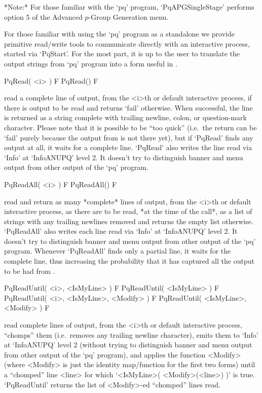 *Note:*
For those familiar with  the  `pq'  program,  `PqAPGSingleStage'  performs
option 5 of the Advanced $p$-Group Generation menu.


For those familiar with using the `pq' program as a standalone we  provide
primitive read/write tools to communicate directly  with  an  interactive
{\ANUPQ} process, started via `PqStart'. For the most part, it is  up  to
the user to translate the output strings from `pq'  program  into  a  form
useful in {\GAP}.

\>PqRead( <i> ) F
\>PqRead() F

read a complete line of  {\ANUPQ}  output,  from  the  <i>th  or  default
interactive {\ANUPQ} process, if there is output to be read  and  returns
`fail' otherwise. When successful, the  line  is  returned  as  a  string
complete with trailing newline, colon, or question-mark character. Please
note that it is possible to be ``too  quick''  (i.e.~the  return  can  be
`fail' purely because the output from {\ANUPQ} is not there yet), but  if
`PqRead' finds any output at all, it waits for a complete line.  `PqRead'
also writes the line read via `Info' at `InfoANUPQ' level 2.  It  doesn't
try to distinguish banner and menu output from other output of  the  `pq'
program.

\>PqReadAll( <i> ) F
\>PqReadAll() F

read and return as many *complete* lines of  {\ANUPQ}  output,  from  the
<i>th or default interactive {\ANUPQ} process, as there are to  be  read,
*at the time of the call*,  as  a  list  of  strings  with  any  trailing
newlines removed and returns the empty list otherwise.  `PqReadAll'  also
writes each line read via `Info' at `InfoANUPQ' level 2. It  doesn't  try
to distinguish banner and menu output  from  other  output  of  the  `pq'
program. Whenever `PqReadAll' finds only a partial line, it waits for  the
complete line, thus increasing the probability that it has  captured  all
the output to be had from {\ANUPQ}.

\>PqReadUntil( <i>, <IsMyLine> ) F
\>PqReadUntil( <IsMyLine> ) F
\>PqReadUntil( <i>, <IsMyLine>, <Modify> ) F
\>PqReadUntil( <IsMyLine>, <Modify> ) F

read complete lines  of  {\ANUPQ}  output,  from  the  <i>th  or  default
interactive {\ANUPQ} process, ``chomps'' them (i.e.~removes any  trailing
newline character), emits them to `Info' at `InfoANUPQ' level 2  (without
trying to distinguish banner and menu output from  other  output  of  the
`pq' program), and applies the function <Modify> (where <Modify>  is  just
the identity map/function for the first two forms)  until  a  ``chomped''
line  <line>  for  which  `<IsMyLine>(  <Modify>(<line>)  )'   is   true.
`PqReadUntil' returns the list of <Modify>-ed ``chomped'' lines read.


